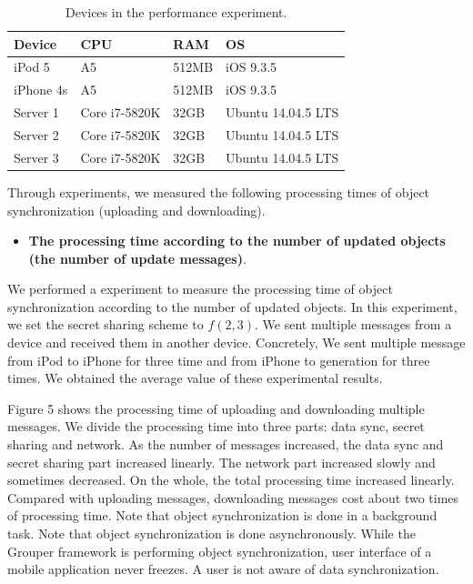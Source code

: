 \documentclass[twocolumn,10pt]{article}
\begin{document}
\begin{table}[t]
	\footnotesize
	\centering  
	\caption{Devices in the performance experiment.}
	\label{my-label}
	\begin{tabular}{llll}
		\hline
		\textbf{Device} & \textbf{CPU} & \textbf{RAM} & \textbf{OS} \\ \hline
		iPod 5 & A5 & 512MB & iOS 9.3.5 \\
		iPhone 4s & A5 & 512MB & iOS 9.3.5 \\
		Server 1 & Core i7-5820K & 32GB & Ubuntu 14.04.5 LTS \\
		Server 2 & Core i7-5820K & 32GB & Ubuntu 14.04.5 LTS \\
		Server 3 & Core i7-5820K & 32GB & Ubuntu 14.04.5 LTS \\ \hline
	\end{tabular}
\end{table}

Through experiments, we measured the following processing times of object synchronization (uploading and downloading).

\begin{itemize}[leftmargin=*]
	\setlength{\itemsep}{1pt}
	\setlength{\parskip}{0pt}
	\setlength{\parsep}{0pt}
	\item \textbf{The processing time according to the number of updated objects (the number of update messages)}.
\end{itemize}

We performed a experiment to measure the processing time of object synchronization according to the number of updated objects.
In this experiment, we set the secret sharing scheme to ${f(2, 3)}$.
We sent multiple messages from a device and received them in another device. 
Concretely, We sent multiple message from iPod to iPhone for three time and from iPhone to generation for three times.
We obtained the average value of these experimental results.

Figure 5 shows the processing time of uploading and downloading multiple messages.
We divide the processing time into three parts: data sync, secret sharing and network.
As the number of messages increased, the data sync and secret sharing part increased linearly. 
The network part increased slowly and sometimes decreased.
On the whole, the total processing time increased linearly.
Compared with uploading messages, downloading messages cost about two times of processing time.
Note that object synchronization is done in a background task.
Note that object synchronization is done asynchronously.
While the Grouper framework is performing object synchronization, user interface of a mobile application never freezes.
A user is not aware of data synchronization.
\end{document}

